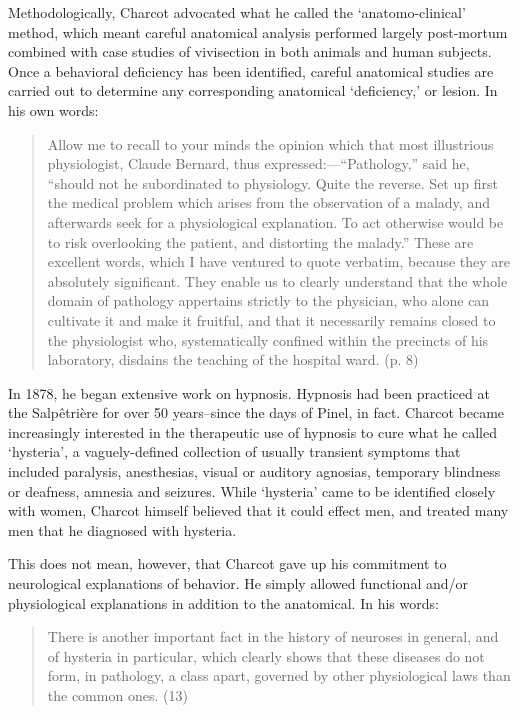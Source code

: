 \begin{refsection}
Methodologically, Charcot advocated what he called the `anatomo-clinical' method, which meant careful anatomical analysis performed largely post-mortum combined with case studies of vivisection in both animals and human subjects. Once a behavioral deficiency has been identified, careful anatomical studies are carried out to determine any corresponding anatomical `deficiency,' or lesion. In his own words:

\begin{quote}

Allow me to recall to your minds the opinion which that most illustrious physiologist, Claude Bernard, thus expressed:---``Pathology,'' said he, ``should not he subordinated to physiology. Quite the reverse. Set up first the medical problem which arises from the observation of a malady, and afterwards seek for a physiological explanation. To act otherwise would be to risk overlooking the patient, and distorting the malady.'' These are excellent words, which I have ventured to quote verbatim, because they are absolutely significant. They enable us to clearly understand that the whole domain of pathology appertains strictly to the physician, who alone can cultivate it and make it fruitful, and that it necessarily remains closed to the physiologist who, systematically confined within the precincts of his laboratory, disdains the teaching of the hospital ward. (p. 8)
\end{quote}

In 1878, he began extensive work on hypnosis. Hypnosis had been practiced at the Salpêtrière for over 50 years--since the days of Pinel, in fact. Charcot became increasingly interested in the therapeutic use of hypnosis to cure what he called `hysteria', a vaguely-defined collection of usually transient symptoms that included paralysis, anesthesias, visual or auditory agnosias, temporary blindness or deafness, amnesia and seizures. While `hysteria' came to be identified closely with women, Charcot himself believed that it could effect men, and treated many men that he diagnosed with hysteria.

This does not mean, however, that Charcot gave up his commitment to neurological explanations of behavior. He simply allowed functional and\slash or physiological explanations in addition to the anatomical. In his words:

\begin{quote}

There is another important fact in the history of neuroses in general, and of hysteria in particular, which clearly shows that these diseases do not form, in pathology, a class apart, governed by other physiological laws than the common ones. (13)
\end{quote}


\end{refsection}
